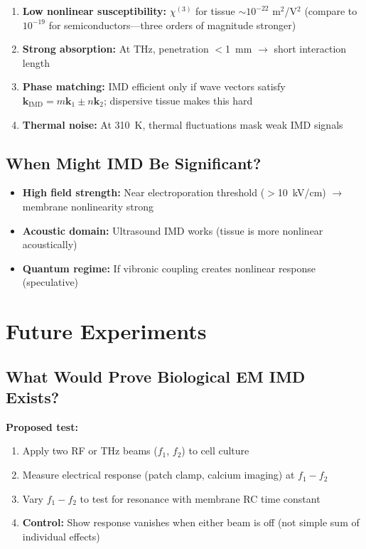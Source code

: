 \begin{enumerate}
\item \textbf{Low nonlinear susceptibility:} $\chi^{(3)}$ for tissue $\sim 10^{-22}$ m$^2$/V$^2$ (compare to $10^{-19}$ for semiconductors---three orders of magnitude stronger)
\item \textbf{Strong absorption:} At THz, penetration $<$1~mm $\rightarrow$ short interaction length
\item \textbf{Phase matching:} IMD efficient only if wave vectors satisfy $\mathbf{k}_{\text{IMD}} = m\mathbf{k}_1 \pm n\mathbf{k}_2$; dispersive tissue makes this hard
\item \textbf{Thermal noise:} At 310~K, thermal fluctuations mask weak IMD signals
\end{enumerate}

\subsection{When Might IMD Be Significant?}

\begin{itemize}
\item \textbf{High field strength:} Near electroporation threshold ($>$10~kV/cm) $\rightarrow$ membrane nonlinearity strong
\item \textbf{Acoustic domain:} Ultrasound IMD works (tissue is more nonlinear acoustically)
\item \textbf{Quantum regime:} If vibronic coupling creates nonlinear response (speculative)
\end{itemize}

\section{Future Experiments}

\subsection{What Would Prove Biological EM IMD Exists?}

\textbf{Proposed test:}
\begin{enumerate}
\item Apply two RF or THz beams ($f_1$, $f_2$) to cell culture
\item Measure electrical response (patch clamp, calcium imaging) at $f_1 - f_2$
\item Vary $f_1 - f_2$ to test for resonance with membrane RC time constant
\item \textbf{Control:} Show response vanishes when either beam is off (not simple sum of individual effects)
\end{enumerate}

